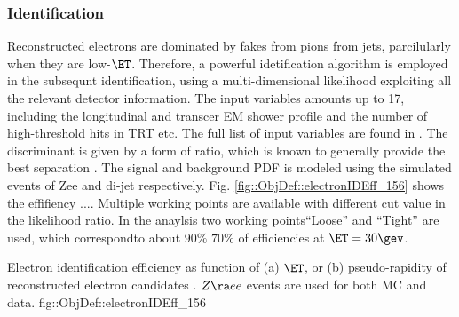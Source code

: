 


\subsubsection{Identification} \label{sec::objDef::electrons::id}
Reconstructed electrons are dominated by fakes from pions from jets, parcilularly when they are low-$\ET$. Therefore, a powerful idetification algorithm is employed in the subsequnt identification, using a multi-dimensional likelihood exploiting all the relevant detector information. The input variables amounts up to 17, including the longitudinal and transcer EM shower profile and the number of high-threshold hits in TRT etc. The full list of input variables are found in \cite{156_ElectronEffMeas_2015data}.
The discriminant is given by a form of ratio, which is known to generally provide the best separation \cite{NPLemma}.
The signal and background PDF is modeled using the simulated events of Zee and di-jet respectively.
Fig. \ref{fig::ObjDef::electronIDEff_156} shows the effifiency ....
Multiple working points are available with different cut value in the likelihood ratio. In the anaylsis two working points``Loose'' and ``Tight'' are used, which correspondto about $90\%$ $70\%$ of efficiencies at $\ET = 30\gev$.

{Electron identification efficiency as function of (a) $\ET$, or (b) pseudo-rapidity of reconstructed electron candidates \cite{156_ElectronEffMeas_2015data}. $Z\ra ee$ events are used for both MC and data.}
{fig::ObjDef::electronIDEff_156}







